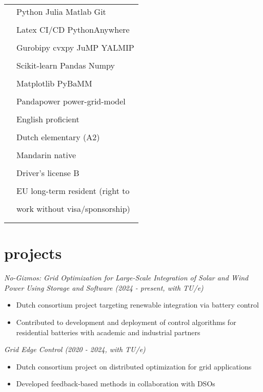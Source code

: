 \documentclass[12pt]{article}
\newcommand{\tableentry}[3]{\textsc{#1} & #2\expandafter\ifstrequal\expandafter{#3}{}{\\}{\\[6pt]}}
\begin{document}
\begin{paracol}{2}
\begin{supertabular}{rl}
  \tableentry{\footnotesize\faCode}{Python \textperiodcentered{} Julia \textperiodcentered{} Matlab
  \textperiodcentered{} Git}{}
  \tableentry{}{Latex \textperiodcentered{} CI/CD \textperiodcentered{} PythonAnywhere}{}

  \tableentry{\footnotesize\faBook}
  { Gurobipy \textperiodcentered{} cvxpy\textperiodcentered{} JuMP \textperiodcentered{} YALMIP }{}
 \tableentry{}{ Scikit-learn \textperiodcentered{} Pandas \textperiodcentered{}  Numpy}{} 
 \tableentry{}{Matplotlib \textperiodcentered{} PyBaMM } {}
   \tableentry{}{ Pandapower \textperiodcentered{} power-grid-model }{} 
  



  \tableentry{\footnotesize\faLanguage}{English \textperiodcentered{} proficient}{}
  \tableentry{}{Dutch \textperiodcentered{} elementary (A2)}{}
    \tableentry{}{Mandarin \textperiodcentered{} native}{}

\tableentry{\footnotesize\faCar}{Driver's license B }{}

\tableentry{\footnotesize\faFile}{EU long-term resident (right to}{}
\tableentry{}{work without visa/sponsorship) }{}

\end{supertabular}


\section{projects}
\raggedright\textit{No-Gizmos: Grid Optimization for Large-Scale Integration of Solar and Wind Power Using Storage and Software (2024 - present, with TU/e)}
\begin{itemize}[noitemsep,leftmargin=3.5mm,rightmargin=0mm,topsep=6pt]
 \item Dutch consortium project targeting renewable integration via battery control
 \item Contributed to development and deployment of control algorithms for residential batteries with academic and industrial partners
\end{itemize}

\raggedright\textit{Grid Edge Control (2020 - 2024, with TU/e)}
\begin{itemize}[noitemsep,leftmargin=3.5mm,rightmargin=0mm,topsep=6pt]
\item Dutch consortium project on distributed optimization for grid applications
\item Developed feedback-based methods in collaboration with DSOs
\end{itemize}



\end{paracol}
\end{document}
